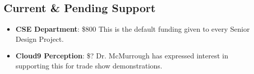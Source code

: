 \subsection{Current \& Pending Support}
\begin{itemize}
    \item \textbf{CSE Department}: \$800 This is the default funding given to every Senior Design Project.
    \item \textbf{Cloud9 Perception}: \$? Dr. McMurrough has expressed interest in supporting this for trade show demonstrations.
\end{itemize}
